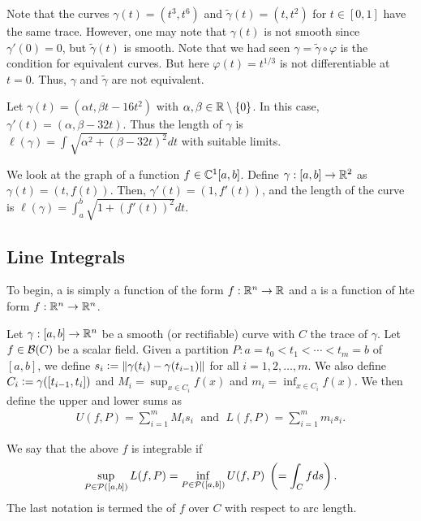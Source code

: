 \begin{example}
    Note that the curves $\gamma(t) = (t^{3},t^{6})$ and $\tilde{\gamma}(t) = (t,t^{2})$ for $t \in [0,1]$ have the same trace. However, one may note that $\gamma(t)$ is not smooth since $\gamma'(0) = 0$, but $\tilde{\gamma}(t)$ is smooth. Note that we had seen $\gamma = \tilde{\gamma} \circ \varphi$ is the condition for equivalent curves. But here $\varphi(t) = t^{1/3}$ is not differentiable at $t=0$. Thus, $\gamma$ and $\tilde{\gamma}$ are not equivalent.
\end{example}

\begin{example}
    Let $\gamma(t) = (\alpha t, \beta t - 16t^{2})$ with $\alpha,\beta \in \mathbb{R} \setminus \{0\}$. In this case, $\gamma'(t) = (\alpha,\beta-32t)$. Thus the length of $\gamma$ is $\ell(\gamma) = \int \sqrt{\alpha^{2} + (\beta-32t)^{2}} dt$ with suitable limits.
\end{example}

\begin{example}
    We look at the graph of a function $f \in \mathbb{C}^{1}[a,b]$. Define $\gamma:[a,b] \to \mathbb{R}^{2}$ as $\gamma(t) = (t,f(t))$. Then, $\gamma'(t) = (1,f'(t))$, and the length of the curve is $\ell(\gamma) = \int_{a}^{b} \sqrt{1+(f'(t))^{2}} dt$.
\end{example}

\subsection{Line Integrals}

To begin, a  is simply a function of the form $f:\mathbb{R}^{n} \to \mathbb{R}$ and a  is a function of hte form $f:\mathbb{R}^{n} \to \mathbb{R}^{n}$.

Let $\gamma:[a,b] \to \mathbb{R}^{n}$ be a smooth (or rectifiable) curve with $C$ the trace of $\gamma$. Let $f \in \mathcal{B}(C)$ be a scalar field. Given a partition $P:a = t_{0} < t_{1} < \cdots < t_{m} = b$ of $[a,b]$, we define $s_{i} \vcentcolon= \left\lVert\gamma(t_{i}) - \gamma(t_{i-1})\right\rVert$ for all $i = 1,2,\ldots,m$. We also define $C_{i} \vcentcolon= \gamma([t_{i-1},t_{i}])$ and $M_{i} = \sup_{x \in C_{i}} f(x)$ and $m_{i} = \inf_{x \in C_{i}} f(x)$. We then define the upper and lower sums as
\begin{align}
    U(f,P) = \sum_{i=1}^{m} M_{i} s_{i} \;\text{ and }\; L(f,P) = \sum_{i=1}^{m} m_{i} s_{i}.
\end{align}

\begin{definition}
    We say that the above $f$ is integrable if
    \begin{align}
        \sup_{P \in \mathcal{P}([a,b])} L(f,P) = \inf_{P \in \mathcal{P}([a,b])} U(f,P) \; \left( = \int_{C} f ds\right).
    \end{align}
    The last notation is termed the  of $f$ over $C$ with respect to arc length.
\end{definition}


